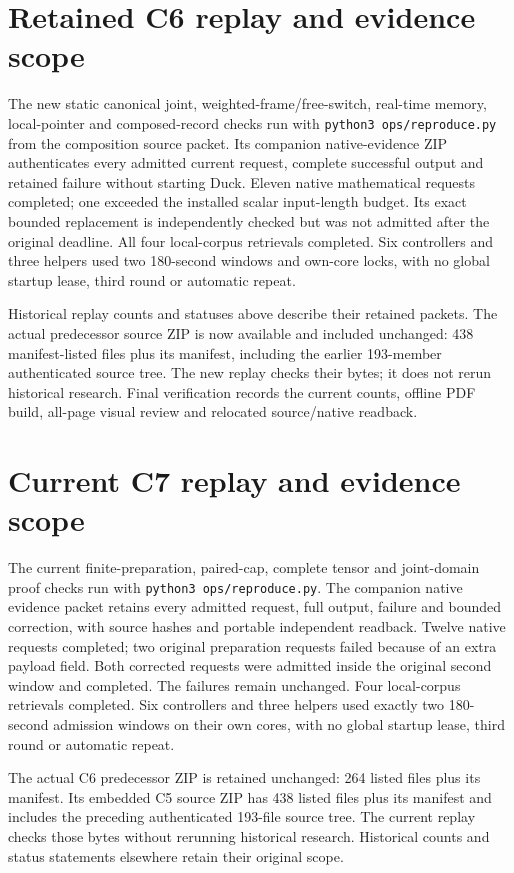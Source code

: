 \documentclass[10pt,twocolumn,letterpaper]{article}
\begin{document}
\section*{Retained C6 replay and evidence scope}
The new static canonical joint, weighted-frame/free-switch, real-time memory,
local-pointer and composed-record checks run with
\texttt{python3 ops/reproduce.py} from the composition source packet.
Its companion native-evidence ZIP authenticates every admitted current
request, complete successful output and retained failure without starting
Duck. Eleven native mathematical requests completed; one exceeded the
installed scalar input-length budget. Its exact bounded replacement is
independently checked but was not admitted after the original deadline.
All four local-corpus retrievals completed. Six controllers and three helpers
used two 180-second windows and own-core locks, with no global startup lease,
third round or automatic repeat.

Historical replay counts and statuses above describe their retained packets.
The actual predecessor source ZIP is now available and included unchanged:
438 manifest-listed files plus its manifest, including the earlier
193-member authenticated source tree. The new replay checks their bytes;
it does not rerun historical research. Final verification records the
current counts, offline PDF build, all-page visual review and relocated
source/native readback.

\section*{Current C7 replay and evidence scope}
The current finite-preparation, paired-cap, complete tensor and joint-domain
proof checks run with \texttt{python3 ops/reproduce.py}. The companion native
evidence packet retains every admitted request, full output, failure and
bounded correction, with source hashes and portable independent readback.
Twelve native requests completed; two original preparation requests failed
because of an extra payload field. Both corrected requests were admitted
inside the original second window and completed. The failures remain
unchanged. Four local-corpus retrievals completed. Six controllers and three
helpers used exactly two 180-second admission windows on their own cores,
with no global startup lease, third round or automatic repeat.

The actual C6 predecessor ZIP is retained unchanged: 264 listed files plus
its manifest. Its embedded C5 source ZIP has 438 listed files plus its
manifest and includes the preceding authenticated 193-file source tree.
The current replay checks those bytes without rerunning historical research.
Historical counts and status statements elsewhere retain their original scope.
\end{document}
